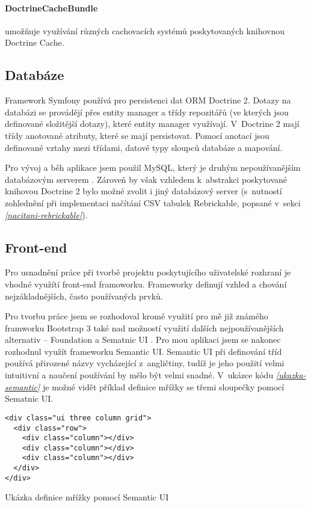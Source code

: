     \paragraph{DoctrineCacheBundle} 
    umožňuje využívání různých cachovacích systémů poskytovaných knihovnou Doctrine Cache. \autocite{doctrinecache}

\subsection{Databáze}
Framework Symfony používá pro persistenci dat \gls{ORM} Doctrine 2. Dotazy na databázi se provádějí přes entity manager a třídy
repozitářů (ve kterých jsou definované složitější dotazy), které entity manager využívají. V~Doctrine 2 mají třídy anotované atributy, které se mají persistovat. Pomocí anotací jsou definované vztahy mezi třídami, datové typy sloupců databáze a mapování.

Pro vývoj a běh aplikace jsem použil MySQL, který je druhým nepoužívanějším databázovým serverem \autocite{database-servers}. Zároveň by však vzhledem k~abstrakci poskytované knihovou Doctrine 2 bylo možné zvolit i jiný databázový server (s~nutností zohlednění při implementaci načítání CSV tabulek Rebrickable, popsané v~sekci \emph{\ref{nacitani-rebrickable}}).

\subsection{Front-end}
Pro usnadnění práce při tvorbě projektu poskytujícího uživatelské rozhraní je vhodné využítí front-end framoworku. Frameworky definují vzhled a chování nejzákladnějších, často používaných prvků. 

Pro tvorbu práce jsem se rozhodoval kromě využití pro mě již známého framworku Bootstrap 3 také nad možností využití dalších nejpoužívanějších alternativ – Foundation a Sematnic UI \autocite{web:frameworks}. Pro mou aplikaci jsem se nakonec rozhodnul využít frameworku Semantic UI. Semantic UI při definování tříd používá přirozené názvy vycházející z~angličtiny, tudíž je jeho použití velmi intuitivní a naučení používání by mělo být velmi snadné. V~ukázce kódu \emph{\ref{ukazka-semantic}} je možné vidět příklad definice mřížky se třemi sloupečky pomocí Sematnic UI.

\begin{listing}[htbp]
  \begin{verbatim}
<div class="ui three column grid">
  <div class="row">
    <div class="column"></div>
    <div class="column"></div>
    <div class="column"></div>
  </div>
</div>
    \end{verbatim}
  \caption{Ukázka definice mřížky pomocí Semantic UI\label{ukazka-semantic}}
\end{listing}